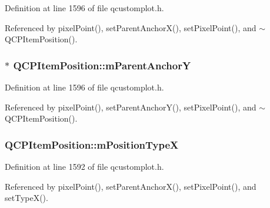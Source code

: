 Definition at line 1596 of file qcustomplot.\+h.



Referenced by pixel\+Point(), set\+Parent\+Anchor\+X(), set\+Pixel\+Point(), and $\sim$\+Q\+C\+P\+Item\+Position().

\hypertarget{class_q_c_p_item_position_afc6142a6a09c8fa41c44d3d54fadd737}{}
\subsubsection[{m\+Parent\+Anchor\+Y}]{ $\ast$ Q\+C\+P\+Item\+Position\+::m\+Parent\+Anchor\+Y\hspace{0.3cm}{\ttfamily [protected]}}\label{class_q_c_p_item_position_afc6142a6a09c8fa41c44d3d54fadd737}


Definition at line 1596 of file qcustomplot.\+h.



Referenced by pixel\+Point(), set\+Parent\+Anchor\+Y(), set\+Pixel\+Point(), and $\sim$\+Q\+C\+P\+Item\+Position().

\hypertarget{class_q_c_p_item_position_ae2a617dce057c5f3ec6878c1823aa291}{}
\subsubsection[{m\+Position\+Type\+X}]{ Q\+C\+P\+Item\+Position\+::m\+Position\+Type\+X\hspace{0.3cm}{\ttfamily [protected]}}\label{class_q_c_p_item_position_ae2a617dce057c5f3ec6878c1823aa291}


Definition at line 1592 of file qcustomplot.\+h.



Referenced by pixel\+Point(), set\+Parent\+Anchor\+X(), set\+Pixel\+Point(), and set\+Type\+X().

\hypertarget{class_q_c_p_item_position_a47c96c0ef4380e1af4aaa7c2265c260b}{}
